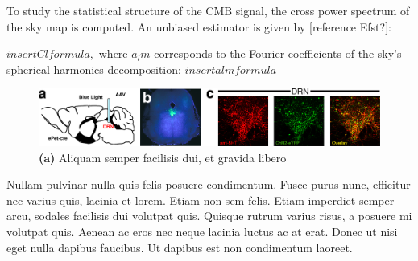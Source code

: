 To study the statistical structure of the CMB signal, the cross power spectrum of the sky map is computed. An unbiased estimator is given by [reference Efst?]:

$ insert Cl formula,$
where $a_lm$ corresponds to the Fourier coefficients of the sky's spherical harmonics decomposition:
$ insert alm formula $ 

\vspace{0.2em}
\begin{figure}
	\begin{minipage}{.94\textwidth}
		\centering\includegraphics[width=\textwidth]{img/og.png}
		\caption{\textbf{(a)}  Aliquam semper facilisis dui, et gravida libero}
	\end{minipage}
\end{figure}
\vspace{0.4em}
Nullam pulvinar nulla quis felis posuere condimentum. Fusce purus nunc, efficitur nec varius quis, lacinia et lorem. Etiam non sem felis. Etiam imperdiet semper arcu, sodales facilisis dui volutpat quis. Quisque rutrum varius risus, a posuere mi volutpat quis. Aenean ac eros nec neque lacinia luctus ac at erat. Donec ut nisi eget nulla dapibus faucibus. Ut dapibus est non condimentum laoreet. 
